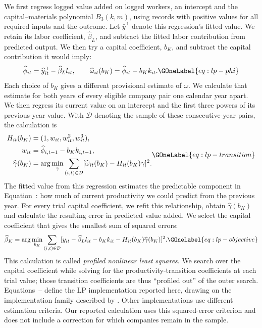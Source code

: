 We first regress logged value added on logged workers, an intercept and the capital--materials polynomial $B_3(k,m)$, using records with positive values for all required inputs and the outcome. Let $\widehat y^{\,1}$ denote this regression's fitted value. We retain its labor coefficient, $\widehat\beta_L$, and subtract the fitted labor contribution from predicted output. We then try a capital coefficient, $b_K$, and subtract the capital contribution it would imply:
\begin{equation}
\widehat\phi_{it}=\widehat y^{\,1}_{it}-\widehat\beta_Ll_{it},\qquad
\widehat\omega_{it}(b_K)=\widehat\phi_{it}-b_Kk_{it}.
\GOneLabel{eq:lp-phi}
\end{equation}
Each choice of $b_K$ gives a different provisional estimate of $\omega$. We calculate that estimate for both years of every eligible company pair one calendar year apart. We then regress its current value on an intercept and the first three powers of its previous-year value. With $\mathcal D$ denoting the sample of these consecutive-year pairs, the calculation is
\begin{equation}
\begin{aligned}
H_{it}(b_K)&=(1,w_{it},w_{it}^2,w_{it}^3),\\
w_{it}&=\widehat\phi_{i,t-1}-b_Kk_{i,t-1},\\
\widehat\gamma(b_K)&=\arg\min_\gamma\sum_{(i,t)\in\mathcal D}
 [\widehat\omega_{it}(b_K)-H_{it}(b_K)\gamma]^2.
\end{aligned}
\GOneLabel{eq:lp-transition}
\end{equation}
The fitted value from this regression estimates the predictable component in Equation~: how much of current productivity we could predict from the previous year. For every trial capital coefficient, we refit this relationship, obtain $\widehat\gamma(b_K)$ and calculate the resulting error in predicted value added. We select the capital coefficient that gives the smallest sum of squared errors:
\begin{equation}
\widehat\beta_K=\arg\min_{b_K}\sum_{(i,t)\in\mathcal D}
 [y_{it}-\widehat\beta_Ll_{it}-b_Kk_{it}-H_{it}(b_K)\widehat\gamma(b_K)]^2.
\GOneLabel{eq:lp-objective}
\end{equation}
This calculation is called \emph{profiled nonlinear least squares}. We search over the capital coefficient while solving for the productivity-transition coefficients at each trial value; those transition coefficients are thus ``profiled out'' of the outer search. Equations~-- define the LP implementation reported here, drawing on the implementation family described by \citet{prodest}. Other implementations use different estimation criteria. Our reported calculation uses this squared-error criterion and does not include a correction for which companies remain in the sample.

